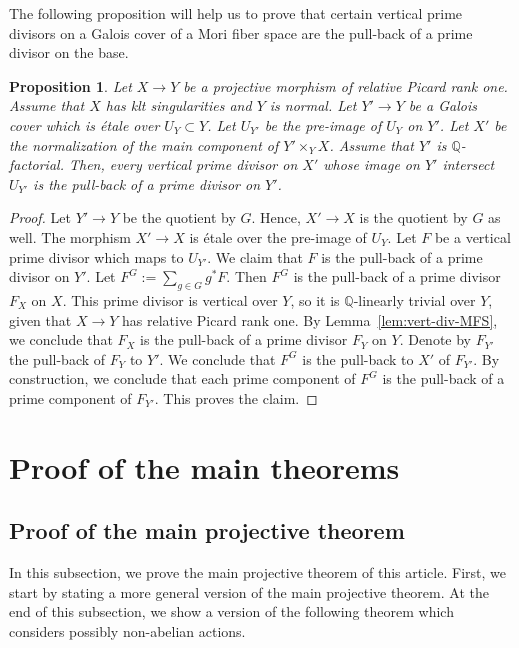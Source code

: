 \documentclass{amsart}
\renewcommand{\qq}{\mathbb{Q}}
\newtheorem{proposition}[theorem]{Proposition}
\theoremstyle{remark}
\numberwithin{equation}{section}
\begin{document}
The following proposition will help us to prove that certain vertical prime divisors on a Galois cover of a Mori fiber space are the pull-back of a prime divisor on the base.

\begin{proposition}\label{prop:galois-cover-uncontractibility}
Let $X\rightarrow Y$ be a projective morphism of relative Picard rank one.
Assume that $X$ has klt singularities and $Y$ is normal.
Let $Y'\rightarrow Y$ be a Galois cover which is \'etale over $U_Y\subset Y$.
Let $U_{Y'}$ be the pre-image of $U_Y$ on $Y'$.
Let $X'$ be the normalization of the main component of $Y'\times_Y X$.
Assume that $Y'$ is $\qq$-factorial.
Then, every vertical prime divisor on $X'$ whose image on $Y'$ intersect $U_{Y'}$ 
is the pull-back of a prime divisor on $Y'$.
\end{proposition}

\begin{proof}
Let $Y'\rightarrow Y$ be the quotient by $G$.
Hence, $X'\rightarrow X$ is the quotient by $G$ as well.
The morphism $X'\rightarrow X$ is \'etale over the pre-image of $U_Y$.
Let $F$ be a vertical prime divisor which maps to $U_{Y'}$.
We claim that $F$ is the pull-back of a prime divisor on $Y'$.
Let $F^G:=\sum_{g\in G}g^*F$.
Then $F^G$ is the pull-back of a prime divisor $F_X$ on $X$.
This prime divisor is vertical over $Y$, so
it is $\qq$-linearly trivial over $Y$,
given that $X\rightarrow Y$ has relative Picard rank one.
By Lemma~\ref{lem:vert-div-MFS}, we conclude that $F_X$ is the pull-back of a prime divisor $F_Y$ on $Y$.
Denote by $F_{Y'}$ the pull-back of $F_Y$ to $Y'$.
We conclude that $F^G$ is the pull-back to $X'$ of $F_{Y'}$.
By construction, we conclude that each prime component of $F^G$ is the pull-back of a prime component of $F_{Y'}$.
This proves the claim.
\end{proof}

\section{Proof of the main theorems}
\subsection{Proof of the main projective theorem}\label{subsec:proof-main-projective}
In this subsection, we prove the main projective theorem of this article.
First, we start by stating a more general version of the main projective theorem.
At the end of this subsection, we show a version of the following theorem which considers possibly non-abelian actions.
\end{document}
